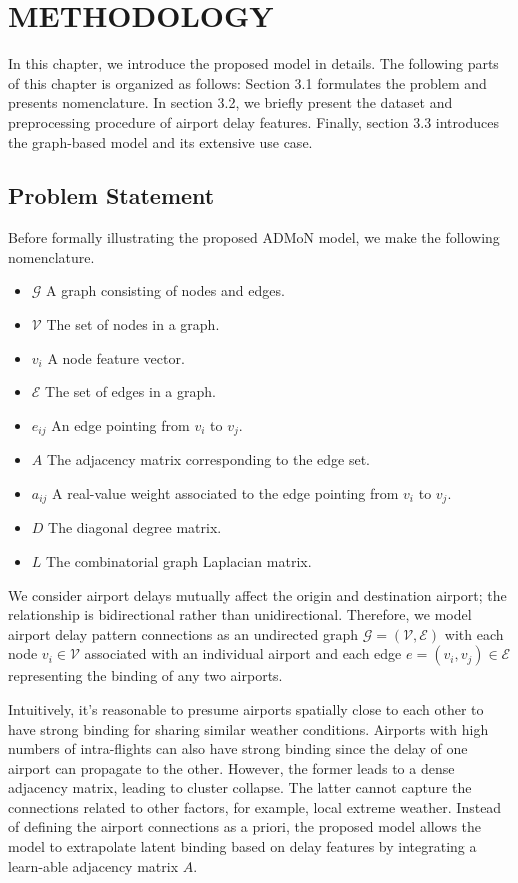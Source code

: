 \chapter{METHODOLOGY}
\pagestyle{fancy}

In this chapter, we introduce the proposed model in details. The following parts of this chapter is organized as follows: Section 3.1 formulates the problem and presents nomenclature. In section 3.2, we briefly present the dataset and preprocessing procedure of airport delay features. Finally, section 3.3 introduces the graph-based model and its extensive use case.

\section{Problem Statement}
\label{ch_3_1}

Before formally illustrating the proposed ADMoN model, we make the following nomenclature.
\begin{itemize}
    \item $\mathcal{G}$ A graph consisting of nodes and edges.
    \item $\mathcal{V}$ The set of nodes in a graph.
    \item $v_i$ A node feature vector.
    \item $\mathcal{E}$ The set of edges in a graph.
    \item $e_{ij}$ An edge pointing from $v_i$ to $v_j$.
    \item $A$ The adjacency matrix corresponding to the edge set.
    \item $a_{ij}$ A real-value weight associated to the edge pointing from $v_i$ to $v_j$.
    \item $D$ The diagonal degree matrix.
    \item $L$ The combinatorial graph Laplacian matrix.
\end{itemize}

We consider airport delays mutually affect the origin and destination airport; the relationship is bidirectional rather than unidirectional. Therefore, we model airport delay pattern connections as an undirected graph $\mathcal{G}=(\mathcal{V},\mathcal{E})$ with each node $v_i\in\mathcal{V}$ associated with an individual airport and each edge $e=(v_i, v_j)\in\mathcal{E}$ representing the binding of any two airports.

Intuitively, it's reasonable to presume airports spatially close to each other to have strong binding for sharing similar weather conditions. Airports with high numbers of intra-flights can also have strong binding since the delay of one airport can propagate to the other. However, the former leads to a dense adjacency matrix, leading to cluster collapse. The latter cannot capture the connections related to other factors, for example, local extreme weather. Instead of defining the airport connections as a priori, the proposed model allows the model to extrapolate latent binding based on delay features by integrating a learn-able adjacency matrix $A$.

